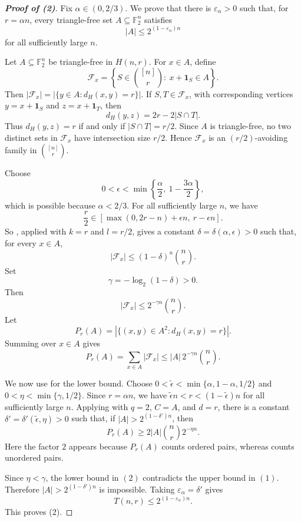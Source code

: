 \documentclass[11pt]{article}
\theoremstyle{plain}
\newcommand{\F}{\mathbb{F}}
\newcommand{\dist}{d_H}
\begin{document}
\begin{proof}[\textbf{Proof of (2)}]
Fix $\alpha\in(0,2/3)$. We prove that there is
$\varepsilon_\alpha>0$ such that, for $r=\alpha n$, every triangle-free
set $A\subseteq\F_2^n$ satisfies
\[
|A|\le 2^{(1-\varepsilon_\alpha)n}
\]
for all sufficiently large $n$.

Let $A\subseteq\F_2^n$ be triangle-free in $H(n,r)$. For $x\in A$, define
\[
\mathcal F_x=\left\{S\in\binom{[n]}{r}:\ x+\mathbf 1_S\in A\right\}.
\]
Then $|\mathcal F_x|=|\{y\in A:\dist(x,y)=r\}|$. If
$S,T\in\mathcal F_x$, with corresponding vertices
$y=x+\mathbf 1_S$ and $z=x+\mathbf 1_T$, then
\[
\dist(y,z)=2r-2|S\cap T|.
\]
Thus $\dist(y,z)=r$ if and only if $|S\cap T|=r/2$. Since $A$ is
triangle-free, no two distinct sets in $\mathcal F_x$ have intersection
size $r/2$. Hence $\mathcal F_x$ is an $(r/2)$-avoiding family in
$\binom{[n]}{r}$.

Choose
\[
0<\epsilon<\min\left\{\frac{\alpha}{2},\ 1-\frac{3\alpha}{2}\right\},
\]
which is possible because $\alpha<2/3$. For all sufficiently large $n$,
we have
\[
\frac r2\in [\max(0,2r-n)+\epsilon n,\ r-\epsilon n].
\]
So , applied with $k=r$ and $l=r/2$, gives a constant
$\delta=\delta(\alpha,\epsilon)>0$ such that, for every $x\in A$,
\[
|\mathcal F_x|\le (1-\delta)^n\binom{n}{r}.
\]
Set
\[
\gamma=-\log_2(1-\delta)>0.
\]
Then
\[
|\mathcal F_x|
\le
2^{-\gamma n}\binom{n}{r}.
\]
Let
\[
P_r(A)=|\{(x,y)\in A^2:\dist(x,y)=r\}|.
\]
Summing over $x\in A$ gives
\[
P_r(A)=\sum_{x\in A}|\mathcal F_x|
\le |A|\,2^{-\gamma n}\binom{n}{r}.
\tag{1}
\]

We now use  for the lower bound. Choose
$0<\tilde\epsilon<\min\{\alpha,1-\alpha,1/2\}$ and $0<\eta<\min\{\gamma,1/2\}$.
Since $r=\alpha n$, we have
$\tilde\epsilon n<r<(1-\tilde\epsilon)n$ for all sufficiently large $n$.
Applying  with $q=2$, $C=A$, and $d=r$, there is a
constant $\delta'=\delta'(\tilde\epsilon,\eta)>0$ such that, if
$|A|>2^{(1-\delta')n}$, then
\[
P_r(A)\ge 2|A|\binom{n}{r}2^{-\eta n}.
\tag{2}
\]
Here the factor $2$ appears because $P_r(A)$ counts ordered pairs, whereas  counts unordered pairs.

Since $\eta<\gamma$, the lower bound in $(2)$ contradicts the upper bound
in $(1)$. Therefore $|A|>2^{(1-\delta')n}$ is impossible. Taking
$\varepsilon_\alpha=\delta'$ gives
\[
T(n,r)\le 2^{(1-\varepsilon_\alpha)n}.
\]
This proves (2).
\end{proof}
\end{document}
